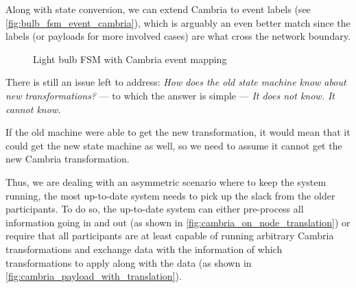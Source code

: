 \documentclass[a4paper]{article}
\begin{document}
Along with state conversion, we can extend Cambria to event labels (see \autoref{fig:bulb_fsm_event_cambria}),
which is arguably an even better match since the labels (or payloads for more involved cases)
are what cross the network boundary.

\begin{figure}[ht]
    \centering
    \caption{Light bulb FSM with Cambria event mapping}
    \label{fig:bulb_fsm_event_cambria}
\end{figure}

There is still an issue left to address: \emph{How does the old state machine know about new transformations?}
— to which the answer is simple — \emph{It does not know. It cannot know.}

If the old machine were able to get the new transformation,
it would mean that it could get the new state machine as well,
so we need to assume it cannot get the new Cambria transformation.

Thus, we are dealing with an asymmetric scenario where to keep the system running,
the most up-to-date system needs to pick up the slack from the older participants.
To do so, the up-to-date system can either pre-process all information going in and out
(as shown in \autoref{fig:cambria_on_node_translation}) or require that all participants are
at least capable of running arbitrary Cambria transformations and exchange data with
the information of which transformations to apply along with the data
(as shown in \autoref{fig:cambria_payload_with_translation}).
\end{document}
